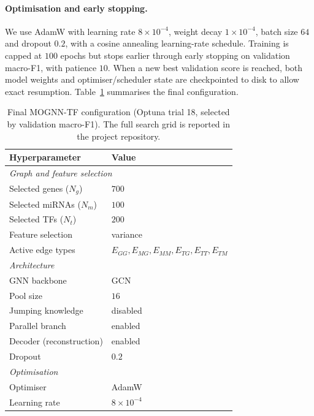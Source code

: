 \documentclass[review,3p,times,11pt, ]{elsarticle} %
\begin{document}
\paragraph{Optimisation and early stopping.}
We use AdamW with learning rate $8 \times 10^{-4}$, weight decay
$1 \times 10^{-4}$, batch size $64$ and dropout $0.2$, with a cosine
annealing learning-rate schedule. Training is capped at $100$ epochs
but stops earlier through early stopping on validation macro-F1, with
patience $10$. When a new best validation score is reached, both model
weights and optimiser/scheduler state are checkpointed to disk to
allow exact resumption. Table~\ref{tab:hyperparams} summarises the
final configuration.

\begin{table}[!t]
\centering
\caption{Final MOGNN-TF configuration (Optuna trial 18, selected by
validation macro-F1). The full search grid is reported in the project
repository.}
\label{tab:hyperparams}
\small
\begin{tabular}{ll}
\toprule
\textbf{Hyperparameter} & \textbf{Value} \\
\midrule
\multicolumn{2}{l}{\textit{Graph and feature selection}} \\
\quad Selected genes ($N_g$)        & $700$ \\
\quad Selected miRNAs ($N_m$)       & $100$ \\
\quad Selected TFs ($N_t$)          & $200$ \\
\quad Feature selection             & variance \\
\quad Active edge types             & $E_{GG}, E_{MG}, E_{MM}, E_{TG}, E_{TT}, E_{TM}$ \\
\midrule
\multicolumn{2}{l}{\textit{Architecture}} \\
\quad GNN backbone                  & GCN \\
\quad Pool size                     & $16$ \\
\quad Jumping knowledge             & disabled \\
\quad Parallel branch               & enabled \\
\quad Decoder (reconstruction)      & enabled \\
\quad Dropout                       & $0.2$ \\
\midrule
\multicolumn{2}{l}{\textit{Optimisation}} \\
\quad Optimiser                     & AdamW \\
\quad Learning rate                 & $8 \times 10^{-4}$ \\

\end{tabular}
\end{table}
\end{document}
